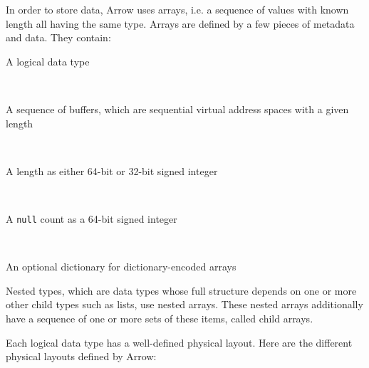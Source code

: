 \documentclass[10pt, a4paper]{report}
\begin{document}
In order to store data, Arrow uses arrays, i.e. a sequence of values with known length all having the same type. Arrays are defined by a few pieces of metadata and data. They contain: \\

\begin{itemize}
	\begin{minipage}{0.92\textwidth}
		\item A logical data type \\
	\end{minipage} \\
	\begin{minipage}{0.92\textwidth}
		\item A sequence of buffers, which are sequential virtual address spaces with a given length \\
	\end{minipage} \\
	\begin{minipage}{0.92\textwidth}
		\item A length as either 64-bit or 32-bit signed integer \\
	\end{minipage} \\
	\begin{minipage}{0.92\textwidth}
		\item A \texttt{null} count as a 64-bit signed integer \\
	\end{minipage} \\
	\begin{minipage}{0.92\textwidth}
		\item An optional dictionary for dictionary-encoded arrays \\
	\end{minipage}
\end{itemize}

Nested types, which are data types whose full structure depends on one or more other child types such as lists, use nested arrays. These nested arrays additionally have a sequence of one or more sets of these items, called child arrays.

Each logical data type has a well-defined physical layout. Here are the different physical layouts defined by Arrow\cite{arrow_format}: \\
\end{document}
